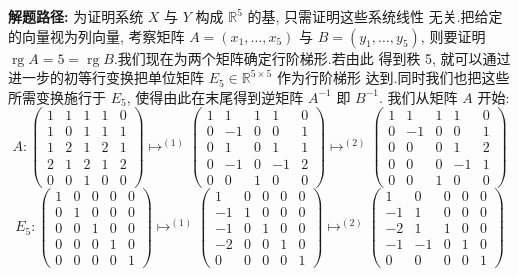 \noindent\textbf{解题路径:} 为证明系统 $X$ 与 $Y$ 构成 $\mathbb{R}^5$ 的基, 只需证明这些系统线性
无关.把给定的向量视为列向量, 考察矩阵 $A = (x_1, \ldots, x_5)$ 与 $B = (y_1, \ldots, y_5)$,
则要证明 $\operatorname{rg} A = 5 = \operatorname{rg} B$.我们现在为两个矩阵确定行阶梯形.若由此
得到秩 5, 就可以通过进一步的初等行变换把单位矩阵 $E_5 \in \mathbb{R}^{5 \times 5}$ 作为行阶梯形
达到.同时我们也把这些所需变换施行于 $E_5$, 使得由此在末尾得到逆矩阵 $A^{-1}$ 即 $B^{-1}$.
我们从矩阵 $A$ 开始:
\[
A \colon \begin{pmatrix} 1 & 1 & 1 & 1 & 0 \\ 1 & 0 & 1 & 1 & 1 \\ 1 & 2 & 1 & 2 & 1 \\ 2 & 1 & 2 & 1 & 2 \\ 0 & 0 & 1 & 0 & 0 \end{pmatrix}
\longmapsto^{(1)} \begin{pmatrix} 1 & 1 & 1 & 1 & 0 \\ 0 & -1 & 0 & 0 & 1 \\ 0 & 1 & 0 & 1 & 1 \\ 0 & -1 & 0 & -1 & 2 \\ 0 & 0 & 1 & 0 & 0 \end{pmatrix}
\longmapsto^{(2)} \begin{pmatrix} 1 & 1 & 1 & 1 & 0 \\ 0 & -1 & 0 & 0 & 1 \\ 0 & 0 & 0 & 1 & 2 \\ 0 & 0 & 0 & -1 & 1 \\ 0 & 0 & 1 & 0 & 0 \end{pmatrix}
\]
\[
E_5 \colon \begin{pmatrix} 1 & 0 & 0 & 0 & 0 \\ 0 & 1 & 0 & 0 & 0 \\ 0 & 0 & 1 & 0 & 0 \\ 0 & 0 & 0 & 1 & 0 \\ 0 & 0 & 0 & 0 & 1 \end{pmatrix}
\longmapsto^{(1)} \begin{pmatrix} 1 & 0 & 0 & 0 & 0 \\ -1 & 1 & 0 & 0 & 0 \\ -1 & 0 & 1 & 0 & 0 \\ -2 & 0 & 0 & 1 & 0 \\ 0 & 0 & 0 & 0 & 1 \end{pmatrix}
\longmapsto^{(2)} \begin{pmatrix} 1 & 0 & 0 & 0 & 0 \\ -1 & 1 & 0 & 0 & 0 \\ -2 & 1 & 1 & 0 & 0 \\ -1 & -1 & 0 & 1 & 0 \\ 0 & 0 & 0 & 0 & 1 \end{pmatrix}
\]
